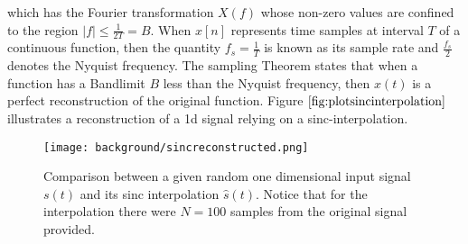 which has the Fourier transformation $X(f)$ whose non-zero values are confined to the region $|f| \leq \frac{1}{2T} = B$.
When $x[n]$ represents time samples at interval $T$ of a continuous function, then the quantity $f_s = \frac{1}{T}$ is known as its sample rate and $\frac{f_s}{2}$ denotes the Nyquist frequency. The sampling Theorem states that when a function has a Bandlimit $B$ less than the Nyquist frequency, then $x(t)$ is a perfect reconstruction of the original function. Figure $\ref{fig:plotsincinterpolation}$ illustrates a reconstruction of a 1d signal relying on a sinc-interpolation.  

\begin{figure}[ht]
  \centering
  \texttt{[image: background/sincreconstructed.png]}
  \caption[Sinc Interpolation Approximation]{Comparison between a given random one dimensional input signal $s(t)$ and its sinc interpolation $\hat{s}(t)$. Notice that for the interpolation there were $N=100$ samples from the original signal provided.}
  \label{fig:plotsincinterpolation}  
\end{figure}
